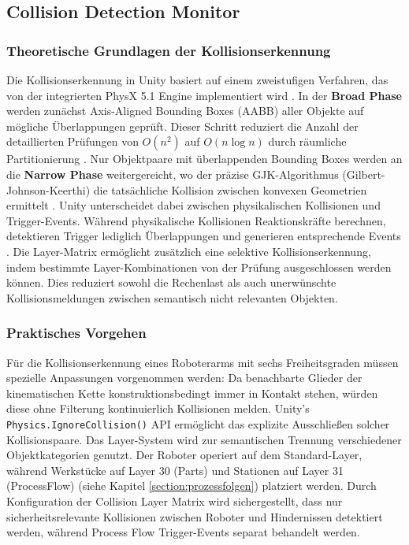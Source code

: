 \subsection{Collision Detection Monitor}
\subsubsection{Theoretische Grundlagen der Kollisionserkennung}
\noindent
Die Kollisionserkennung in Unity basiert auf einem zweistufigen Verfahren, das
von der integrierten PhysX 5.1 Engine implementiert wird
. In der \textbf{Broad Phase} werden zunächst
Axis-Aligned Bounding Boxes (AABB) aller Objekte auf mögliche Überlappungen
geprüft. Dieser Schritt reduziert die Anzahl der detaillierten Prüfungen von
$O(n^2)$ auf $O(n \log n)$ durch räumliche Partitionierung
. Nur Objektpaare mit überlappenden Bounding Boxes
werden an die \textbf{Narrow Phase} weitergereicht, wo der präzise
GJK-Algorithmus (Gilbert-Johnson-Keerthi) die tatsächliche Kollision zwischen
konvexen Geometrien ermittelt .
\noindent
Unity unterscheidet dabei zwischen physikalischen Kollisionen und
Trigger-Events. Während physikalische Kollisionen Reaktionskräfte berechnen,
detektieren Trigger lediglich Überlappungen und generieren entsprechende Events
. Die Layer-Matrix ermöglicht zusätzlich eine selektive
Kollisionserkennung, indem bestimmte Layer-Kombinationen von der Prüfung
ausgeschlossen werden können. Dies reduziert sowohl die Rechenlast als auch
unerwünschte Kollisionsmeldungen zwischen semantisch nicht relevanten Objekten.

\subsubsection{Praktisches Vorgehen}
\noindent
Für die Kollisionserkennung eines Roboterarms mit sechs Freiheitsgraden müssen
spezielle Anpassungen vorgenommen werden: Da benachbarte Glieder der
kinematischen Kette konstruktionsbedingt immer in Kontakt stehen, würden diese
ohne Filterung kontinuierlich Kollisionen melden. Unity's
\texttt{Physics.IgnoreCollision()} API ermöglicht das explizite Ausschließen
solcher Kollisionspaare.
\noindent
Das Layer-System wird zur semantischen Trennung verschiedener Objektkategorien
genutzt. Der Roboter operiert auf dem Standard-Layer, während Werkstücke auf
Layer 30 (Parts) und Stationen auf Layer 31 (ProcessFlow) (siehe Kapitel
\ref{section:prozessfolgen}) platziert werden.
Durch Konfiguration der Collision Layer Matrix wird sichergestellt, dass nur
sicherheitsrelevante Kollisionen zwischen Roboter und Hindernissen detektiert
werden, während Process Flow Trigger-Events separat behandelt werden.

